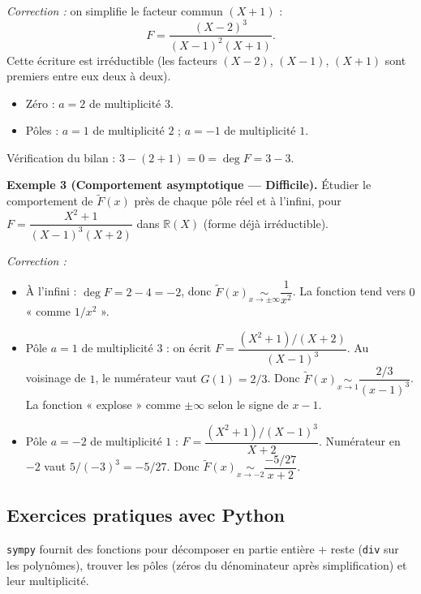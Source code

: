 \documentclass[12pt,a4paper]{report}
\theoremstyle{definition}
\theoremstyle{remark}
\begin{document}
\textit{Correction :} on simplifie le facteur commun $(X + 1)$ :
\[ F = \frac{(X - 2)^3}{(X - 1)^2 (X + 1)}. \]
Cette écriture est irréductible (les facteurs $(X - 2)$, $(X - 1)$, $(X + 1)$ sont premiers entre eux deux à deux).
\begin{itemize}
    \item Zéro : $a = 2$ de multiplicité $3$.
    \item Pôles : $a = 1$ de multiplicité $2$ ; $a = -1$ de multiplicité $1$.
\end{itemize}
Vérification du bilan : $3 - (2 + 1) = 0 = \deg F = 3 - 3$. \checkmark

\medskip

\textbf{Exemple 3 (Comportement asymptotique --- Difficile).}
Étudier le comportement de $\widetilde{F}(x)$ près de chaque pôle réel et à l'infini, pour $F = \dfrac{X^2 + 1}{(X - 1)^3 (X + 2)}$ dans $\mathbb{R}(X)$ (forme déjà irréductible).

\textit{Correction :}
\begin{itemize}
    \item À l'infini : $\deg F = 2 - 4 = -2$, donc $\widetilde{F}(x) \underset{x \to \pm \infty}{\sim} \dfrac{1}{x^2}$. La fonction tend vers $0$ « comme $1/x^2$ ».
    \item Pôle $a = 1$ de multiplicité $3$ : on écrit $F = \dfrac{(X^2 + 1)/(X + 2)}{(X - 1)^3}$. Au voisinage de $1$, le numérateur vaut $G(1) = 2/3$. Donc $\widetilde{F}(x) \underset{x \to 1}{\sim} \dfrac{2/3}{(x - 1)^3}$. La fonction « explose » comme $\pm \infty$ selon le signe de $x - 1$.
    \item Pôle $a = -2$ de multiplicité $1$ : $F = \dfrac{(X^2 + 1)/(X - 1)^3}{X + 2}$. Numérateur en $-2$ vaut $5 / (-3)^3 = -5/27$. Donc $\widetilde{F}(x) \underset{x \to -2}{\sim} \dfrac{-5/27}{x + 2}$.
\end{itemize}

\subsection{Exercices pratiques avec Python}
\texttt{sympy} fournit des fonctions pour décomposer en partie entière + reste (\texttt{div} sur les polynômes), trouver les pôles (zéros du dénominateur après simplification) et leur multiplicité.
\end{document}
